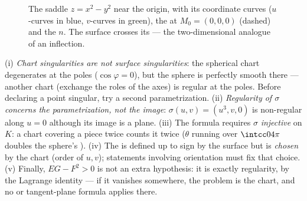 \begin{figure}[ht]
\centering
{}
\caption{The saddle $z = x^2 - y^2$ near the origin, with its
coordinate curves ($u$-curves in blue, $v$-curves in green), the
 at $M_0 = (0,0,0)$ (dashed) and the  $n$.
The surface crosses its  --- the two-dimensional
analogue of an inflection.}
\label{fig:b2:surfaces:saddle}
\end{figure}

\begin{remark}
(i) \emph{Chart singularities are not surface singularities}:
the spherical chart degenerates at the poles
($\cos\varphi = 0$), but the sphere is perfectly smooth there
--- another chart (exchange the roles of the axes) is regular
at the poles. Before declaring a point singular, try a second
parametrization. (ii) \emph{Regularity of $\sigma$ concerns
the parametrization, not the image}: $\sigma(u, v) = (u^3, v,
0)$ is non-regular along $u = 0$ although its image is a
plane. (iii) The  formula requires $\sigma$
\emph{injective} on $K$: a chart covering a piece twice
counts it twice ($\theta$ running over $\intcc0{4\pi}$
doubles the sphere's ). (iv) The  is defined
up to sign by the surface but is \emph{chosen} by the chart
(order of $u, v$); statements involving orientation must fix
that choice. (v) Finally, $EG - F^2 > 0$ is not an extra
hypothesis: it is exactly regularity, by the Lagrange
identity --- if it vanishes somewhere, the problem is the
chart, and no  or tangent-plane formula applies there.
\end{remark}

